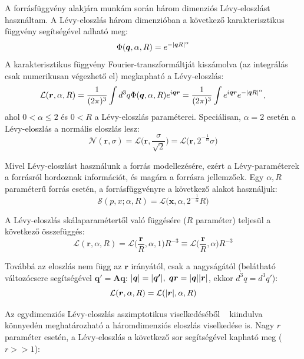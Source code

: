 \documentclass[11pt,a4paper]{article}
\numberwithin{equation}{subsection}
\numberwithin{figure}{section}
\begin{document}
A forrásfüggvény alakjára munkám során három dimenziós Lévy-eloszlást használtam. A Lévy-eloszlás három dimenzióban a következő karakterisztikus függvény segítségével adható meg:
\begin{equation}
\Phi(\bm{q}, \alpha, R) = e^{-\abs{\bm{q}R}^\alpha}
\end{equation}
A karakterisztikus függvény Fourier-transzformáltját kiszámolva (az integrálás csak numerikusan végezhető el) megkapható a Lévy-eloszlás:
\begin{equation}
\mathcal{L}(\bm{r},\alpha,R) = \frac{1}{(2\pi)^3}\int d^3q \Phi(\bm{q}, \alpha, R)e^{i\bm{qr}}= \frac{1}{(2\pi)^3}\int e^{i\bm{qr}}e^{-\abs{\bm{q}R}^\alpha},
 \label{eq:Levyint}
\end{equation}
\noindent
ahol $0< \alpha \leq 2$ és $0<R$ a Lévy-eloszlás paraméterei. Speciálisan, $\alpha=2$ esetén a Lévy-eloszlás a normális eloszlás lesz:
\begin{equation}
\mathcal{N}(\bm{r},\sigma) = \mathcal{L}\bigg(\bm{r}, \frac{\sigma}{\sqrt{2}}\bigg) = \mathcal{L}\big(\bm{r}, 2^{-\frac{1}{\alpha}}\sigma\big)
\end{equation}

Mivel Lévy-eloszlást használunk a forrás modellezésére, ezért a Lévy-paraméterek a forrásról hordoznak információt, és magára a forrásra jellemzőek. Egy $\alpha, R$ paraméterű forrás esetén, a forrásfüggvényre a következő alakot használjuk:
\begin{equation}
\mathcal{S}(p,x; \alpha, R) =\mathcal{L}\big(\bm{x}, \alpha, 2^{-\frac{1}{\alpha}}R\big)
\end{equation}

A Lévy-eloszlás skálaparamétertől való függésére ($R$ paraméter) teljesül a következő összefüggés:
\begin{equation}
\mathcal{L}(\bm{r}, \alpha, R) = \mathcal{L}\bigg(\frac{\bm{r}}{R}, \alpha, 1\bigg)R^{-3}\equiv \mathcal{L}\bigg(\frac{\bm{r}}{R}, \alpha\bigg)R^{-3}
\label{eq:LevyintR}
\end{equation}

Továbbá az eloszlás nem függ az $\bm{r}$ irányától, csak a nagyságától (belátható változócsere segítségével $\bm{q'}=\bm{Aq}$: $\abs{\bm{q}}=\abs{\bm{q'}},\;\bm{qr}=\abs{\bm{q}}\abs{\bm{r}}$, ekkor $d^3 q=d^3 q'$):
\begin{equation}
\mathcal{L}(\bm{r}, \alpha, R)=\mathcal{L}(\abs{\bm{r}}, \alpha, R)
\label{eq:LevyintO}
\end{equation}

Az egydimenziós Lévy-eloszlás aszimptotikus viselkedéséből  ~\cite{LevyEff} kiindulva könnyedén meghatározható a háromdimenziós eloszlás viselkedése is. Nagy $r$ paraméter esetén, a Lévy-eloszlás a következő sor segítségével kapható meg ($r>>1$):
\end{document}
